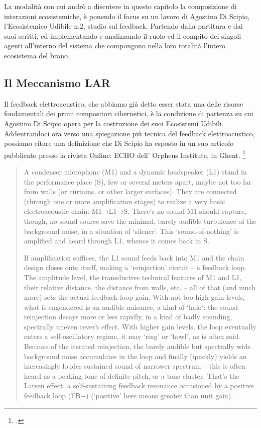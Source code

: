 La modalità con cui andrò a discutere in questo capitolo la composizione di interazioni ecosistemiche, 
è ponendo il focus su un lavoro di Agostino Di Scipio, l’Ecosistemico Udibile n.2, studio sul feedback. 
Partendo dalla partitura e dai suoi scritti, ed implementando e analizzando
il ruolo ed il compito dei singoli agenti all'interno del sistema 
che compongono nella loro totalità l'intero ecosistema del brano. 

\subsection{Il Meccanismo LAR}
\label{sec:Il Meccanismo LAR}

Il feedback elettroacustico, che abbiamo già detto
esser stata una delle risorse fondamentali dei primi compositori cibernetici,
è la condizione di partenza su cui Agostino Di Scipio opera per la costruzione dei suoi Ecosistemi Udibili.
Addentrandoci ora verso una spiegazione più tecnica del feedback elettroacustico,
possiamo citare una definizione che Di Scipio ha esposto in un suo articolo
pubblicato presso la rivista Online: ECHO dell’ Orpheus Institute, in
Ghent. \footcite{di_scipio_relational_2022}

\begin{quote}
A condenser microphone (M1) and a dynamic loudspeaker (L1) stand in the performance place
(S), few or several meters apart, maybe not too far from walls (or curtains, or other larger
surfaces). They are connected (through one or more amplification stages) to realize a very
basic electroacoustic chain: M1→L1→S. There’s no sound M1 should capture, though, no sound
source save the minimal, barely audible turbulence of the background noise, in a situation of
‘silence’. This ‘sound-of-nothing’ is amplified and heard through L1, whence it comes back in
S.

If amplification suffices, the L1 sound feeds back into M1 and the chain design closes onto
itself, making a ‘reinjection’ circuit – a feedback loop. The amplitude level, the
transductive technical features of M1 and L1, their relative distance, the distance from
walls, etc. – all of that (and much more) sets the actual feedback loop gain. With
not-too-high gain levels, what is engendered is an audible nuisance, a kind of ‘halo’: the
sound reinjection decays more or less rapidly, in a kind of badly sounding, spectrally uneven
reverb effect. With higher gain levels, the loop eventually enters a self-oscillatory regime,
it may ‘ring’ or ‘howl’, as is often said. Because of the iterated reinjection, the barely
audible but spectrally wide background noise accumulates in the loop and finally (quickly)
yields an increasingly louder sustained sound of narrower spectrum – this is often heard as a
peaking tone of definite pitch, or a tone cluster. That’s the Larsen effect: a self-sustaining
feedback resonance occasioned by a positive feedback loop (FB+) (‘positive’ here means greater
than unit gain).
\end{quote}

